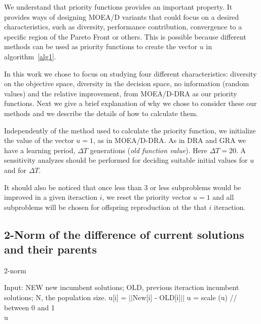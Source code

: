 
We understand that priority functions provides an important property. It provides ways of designing MOEA/D variants that could focus on a desired characteristics, such as diversity, performance contribution, convergence to a specific region of the Pareto Front or others. This is possible because different methods can be used as priority functions to create the vector $u$ in algorithm~\ref{alg1}. 

In this work we chose to focus on studying four different characteristics: diversity on the objective space, diversity in the decision space, no information (random values) and the relative improvement, from MOEA/D-DRA as our priority functions. Next we give a brief explanation of why we chose to consider these  our methods and we describe the details of how to calculate them.

Independently of the method used to calculate the priority function, we initialize the value of the vector $u=1$, as in MOEA/D-DRA. As in DRA and GRA we have a learning period, $\Delta T$ generations (\textit{old function value}). Here $\Delta T=20$.   A sensitivity analyzes should be performed for deciding suitable initial values for $u$ and for $\Delta T$.

 It should also be noticed that once less than $3$ or less subproblems would be improved in a given iteraction $i$, we reset the priority vector $u = 1$  and all subproblems will be chosen for offspring reproduction at the that $i$ iteraction.

\subsection{2-Norm of the difference of current solutions and their parents} 

\begin{algorithm}[t]
	\caption{2-norm}\label{alg3}
	\begin{algorithmic}[1]
		
		\State Input: NEW new incumbent solutions; OLD, previous iteraction incumbent solutions; N, the population size.
			\State u[i] = $||$New[i] - OLD[i]$||$
		\EndFor
		\State u = scale (u) // between 0 and 1\\
	\Return u
	\end{algorithmic}
\end{algorithm}

